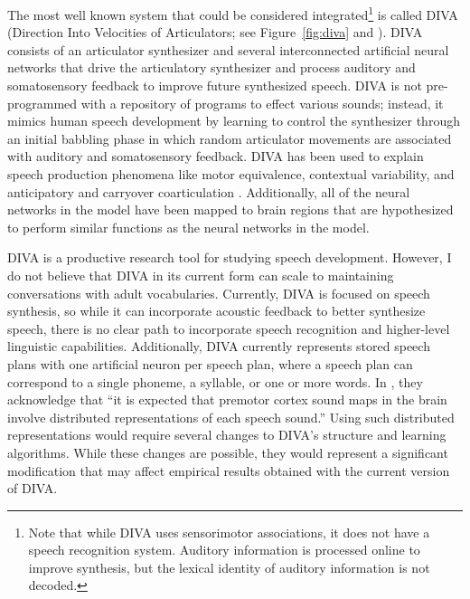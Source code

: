 The most well known system
that could be considered integrated\footnote{
  Note that while DIVA uses sensorimotor associations,
  it does not have a speech recognition system.
  Auditory information is processed online
  to improve synthesis,
  but the lexical identity of auditory information
  is not decoded.}
is called DIVA
(Direction Into Velocities of Articulators;
see Figure~\ref{fig:diva} and
\citealt{guenther1995,guenther2004,guenther2006,guenther2006a}).
DIVA consists of an articulator synthesizer
and several interconnected artificial neural networks
that drive the articulatory synthesizer
and process auditory and somatosensory feedback
to improve future synthesized speech.
DIVA is not pre-programmed with a repository
of programs to effect various sounds;
instead, it mimics human speech development
by learning to control the synthesizer
through an initial babbling phase
in which random articulator movements
are associated with auditory
and somatosensory feedback.
DIVA has been used to explain
speech production phenomena
like motor equivalence, contextual variability,
and anticipatory and carryover coarticulation
\citep{guenther1995,guenther2003,nieto2005}.
Additionally, all of the neural networks
in the model have been mapped
to brain regions that are hypothesized
to perform similar functions
as the neural networks in the model.


DIVA is a productive research tool
for studying speech development.
However, I do not believe that DIVA
in its current form
can scale to maintaining conversations
with adult vocabularies.
Currently, DIVA is focused on speech synthesis,
so while it can incorporate acoustic feedback
to better synthesize speech,
there is no clear path
to incorporate speech recognition
and higher-level linguistic capabilities.
Additionally, DIVA currently represents
stored speech plans with one artificial
neuron per speech plan,
where a speech plan can correspond to
a single phoneme, a syllable, or one or more words.
In \citet{guenther2006a},
they acknowledge that ``it is expected that
premotor cortex sound maps in the brain
involve distributed representations
of each speech sound.''
Using such distributed representations
would require several changes to DIVA's
structure and learning algorithms.
While these changes are possible,
they would represent a significant
modification that may affect
empirical results obtained
with the current version of DIVA.

